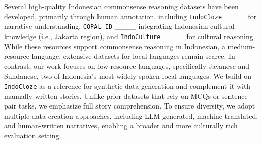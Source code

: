 Several high-quality Indonesian commonsense reasoning datasets have been developed, primarily through human annotation, including \texttt{IndoCloze} ____ for narrative understanding, \texttt{COPAL-ID} ____ integrating Indonesian cultural knowledge (i.e., Jakarta region), and \texttt{IndoCulture} ____ for cultural reasoning. While these resources support commonsense reasoning in Indonesian, a medium-resource language, extensive datasets for local languages remain scarce. In contrast, our work focuses on low-resource languages, specifically Javanese and Sundanese, two of Indonesia’s most widely spoken local languages. We build on \texttt{IndoCloze} as a reference for synthetic data generation and complement it with manually written stories. Unlike prior datasets that rely on MCQs or sentence-pair tasks, we emphasize full story comprehension. To ensure diversity, we adopt multiple data creation approaches, including LLM-generated, machine-translated, and human-written narratives, enabling a broader and more culturally rich evaluation setting.



